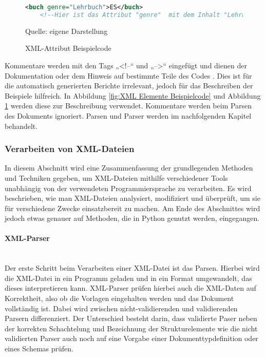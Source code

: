 \begin{figure}[H]
\centering
\begin{minipage}{0.95\textwidth}
\begin{lstlisting}[language=XML]
<buch genre="Lehrbuch">ES</buch>
    <!--Hier ist das Attribut "genre"  mit dem Inhalt "Lehrbuch"-->
\end{lstlisting}
\end{minipage}
\caption{XML-Attribut Beispielcode}
\label{fig: XML Attribute Beispielcode}
    {Quelle: eigene Darstellung}
\end{figure}

Kommentare werden mit den Tags „<!--“ und „-->“ eingefügt und dienen der Dokumentation oder dem Hinweis auf bestimmte Teile des Codes \cite*[10-14]{Becher2022}.
Dies ist für die automatisch generierten Berichte irrelevant, jedoch für das Beschreiben der Beispiele hilfreich.
In Abbildung \ref{fig:XML Elemente Beispielcode} und Abbildung \ref{fig: XML Attribute Beispielcode} werden diese zur Beschreibung verwendet.
Kommentare werden beim Parsen des Dokuments ignoriert.
Parsen und Parser werden im nachfolgenden Kapitel behandelt.

\subsubsection{Verarbeiten von XML-Dateien}
In diesem Abschnitt wird eine Zusammenfassung der grundlegenden Methoden und Techniken gegeben,
um \ac{XML}-Dateien mithilfe verschiedener Tools unabhängig von der verwendeten Programmiersprache zu verarbeiten.
Es wird beschrieben, wie man \ac{XML}-Dateien analysiert, modifiziert und überprüft, um sie für verschiedene Zwecke einsatzbereit zu machen.
Am Ende des Abschnittes wird jedoch etwas genauer auf Methoden, die in Python genutzt werden, eingegangen.


\paragraph{XML-Parser}

\\

Der erste Schritt beim Verarbeiten einer \ac{XML}-Datei ist das Parsen.
Hierbei wird die \ac{XML}-Datei in ein Programm geladen und in ein Format umgewandelt, das dieses interpretieren kann.
XML-Parser prüfen hierbei auch die \ac{XML}-Daten auf Korrektheit, also ob die Vorlagen eingehalten werden und das Dokument vollständig ist.
Dabei wird zwischen nicht-validierenden und validierenden Parsern differenziert.
Der Unterschied besteht darin, dass validierte Paser neben der korrekten Schachtelung und Bezeichnung der Strukturelemente
wie die nicht validierten Parser auch noch auf eine Vorgabe einer Dokumenttypdefinition oder eines Schemas prüfen. \cite*[10]{Becher2022}

